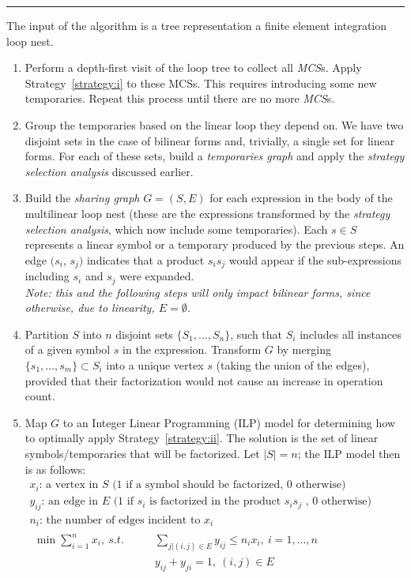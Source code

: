 \noindent\rule[0.01ex]{\linewidth}{0.7pt}

\begin{Algo}
\label{algo:sharing-elimination}
\normalfont 
The input of the algorithm is a tree representation a finite element integration loop nest.
\begin{enumerate}
\item Perform a depth-first visit of the loop tree to collect all {\em MCS}s. Apply Strategy~\ref{strategy:i} to these MCSs. This requires introducing some new temporaries. Repeat this process until there are no more {\em MCS}s.

\item Group the temporaries based on the linear loop they depend on. We have two disjoint sets in the case of bilinear forms and, trivially, a single set for linear forms. For each of these sets, build a {\em temporaries graph} and apply the {\em strategy selection analysis} discussed earlier.

\item Build the {\em sharing graph} $G = (S, E)$ for each expression in the body of the multilinear loop nest (these are the expressions transformed by the {\em strategy selection analysis}, which now include some temporaries). Each $s \in S$ represents a linear symbol or a temporary produced by the previous steps. An edge $(s_i$, $s_j)$ indicates that a product $s_i s_j$ would appear if the sub-expressions including $s_i$ and $s_j$ were expanded.\\
\textit{Note: this and the following steps will only impact bilinear forms, since otherwise, due to linearity, $E = \emptyset$.}

\item Partition $S$ into $n$ disjoint sets $\lbrace S_1, ..., S_n\rbrace$, such that $S_i$ includes all instances of a given symbol $s$ in the expression. Transform $G$ by merging $\lbrace s_1, ..., s_m \rbrace \subset S_i$ into a unique vertex $s$ (taking the union of the edges), provided that their factorization would not cause an increase in operation count.

\item Map $G$ to an Integer Linear Programming (ILP) model for determining how to optimally apply Strategy~\ref{strategy:ii}. The solution is the set of linear symbols/temporaries that will be factorized. Let $|S| = n$; the ILP model then is as follows:
\begin{gather*}
x_i \text{: a vertex in } S \text{ (1 if a symbol should be factorized, 0 otherwise)}\\
y_{ij} \text{: an edge in } E \text{ (1 if } s_i \text{ is factorized in the product } s_i s_j \text{ , 0 otherwise)}\\
n_i \text{: the number of edges incident to } x_i \\
\begin{align*}
\min \sum_{i=1}^{n} x_i,\ s.t. ~~~~~~~~~&\sum_{j|(i,j) \in E} y_{ij} \leq n_i x_i,\ i = 1, ..., n \\
& y_{ij} + y_{ji} = 1,\ (i, j) \in E
\end{align*}
\phantom{\hspace{6cm}}
\end{gather*}



\end{enumerate}
\end{Algo}
